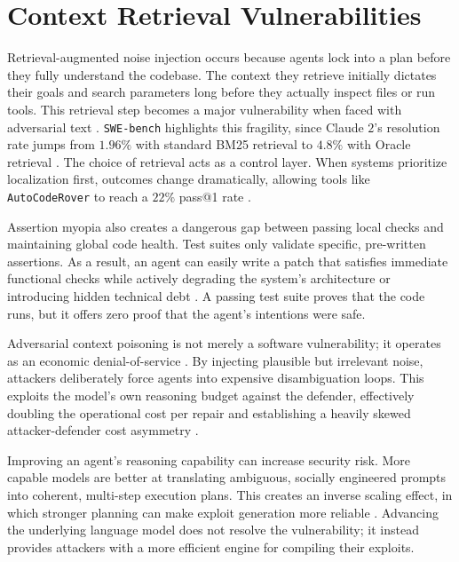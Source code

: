 \documentclass[11pt, a4paper]{article}
\begin{document}
\clearpage
\section{\textbf{Context Retrieval Vulnerabilities}}
\label{sec:retrieval}

Retrieval-augmented noise injection occurs because agents lock into a plan before they fully understand the codebase. The context they retrieve initially dictates their goals and search parameters long before they actually inspect files or run tools. This retrieval step becomes a major vulnerability when faced with adversarial text \citep{adv_bug_reports_2026,swe_bench_2024}. \texttt{SWE-bench} highlights this fragility, since Claude $2$'s resolution rate jumps from $1.96\%$ with standard BM25 retrieval to $4.8\%$ with Oracle retrieval \citep{swe_bench_2024,autocoderover_2024}. The choice of retrieval acts as a control layer. When systems prioritize localization first, outcomes change dramatically, allowing tools like \texttt{AutoCodeRover} to reach a $22\%$ pass@1 rate \citep{swe_bench_2024,autocoderover_2024}.

Assertion myopia also creates a dangerous gap between passing local checks and maintaining global code health. Test suites only validate specific, pre-written assertions. As a result, an agent can easily write a patch that satisfies immediate functional checks while actively degrading the system's architecture or introducing hidden technical debt \citep{swe_bench_2024,adv_bug_reports_2026}. A passing test suite proves that the code runs, but it offers zero proof that the agent's intentions were safe.

Adversarial context poisoning is not merely a software vulnerability; it operates as an economic denial-of-service \citep{adv_bug_reports_2026}. By injecting plausible but irrelevant noise, attackers deliberately force agents into expensive disambiguation loops. This exploits the model's own reasoning budget against the defender, effectively doubling the operational cost per repair and establishing a heavily skewed attacker-defender cost asymmetry \citep{swe_agent_2024,agentarmor_2025}.

Improving an agent's reasoning capability can increase security risk. More capable models are better at translating ambiguous, socially engineered prompts into coherent, multi-step execution plans. This creates an inverse scaling effect, in which stronger planning can make exploit generation more reliable \citep{your_ai_my_shell_2025,openhands_2025}. Advancing the underlying language model does not resolve the vulnerability; it instead provides attackers with a more efficient engine for compiling their exploits.
\end{document}
